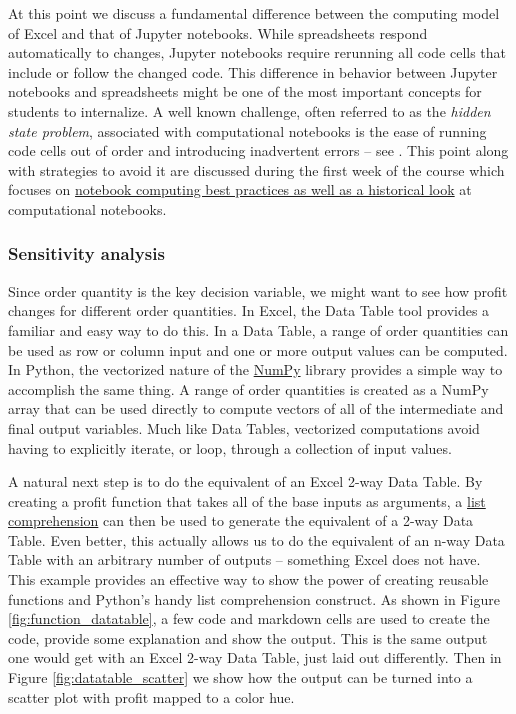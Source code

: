 \documentclass[ited]{informs3}                      %
\begin{document}
At this point we discuss a fundamental difference between the computing model of Excel and that of Jupyter notebooks. While spreadsheets respond automatically to changes, Jupyter notebooks require rerunning all code cells that include or follow the changed code. This difference in behavior between Jupyter notebooks and spreadsheets might be one of the most important concepts for students to internalize. A well known challenge, often referred to as the \textit{hidden state problem}, associated with computational notebooks is the ease of running code cells out of order and introducing inadvertent errors -- see \citet{johnson2020benefits,grusDonNotebooks2018}. This point along with strategies to avoid it are discussed during the first week of the course which focuses on \href{http://www.sba.oakland.edu/faculty/isken/courses/aap/jupyter_notebooks.html}{notebook computing best practices as well as a historical look} at computational notebooks.

\subsubsection{Sensitivity analysis}

Since order quantity is the key decision variable, we might want to see how profit changes for different order quantities. In Excel, the Data Table tool provides a familiar and easy way to do this. In a Data Table, a range of order quantities can be used as row or column input and one or more output values can be computed. In Python, the vectorized nature of the \href{https://numpy.org/}{NumPy} library \citep{harris2020array} provides a simple way to accomplish the same thing. A range of order quantities is created as a NumPy array that can be used directly to compute vectors of all of the intermediate and final output variables. Much like Data Tables, vectorized computations avoid having to explicitly iterate, or loop, through a collection of input values.

A natural next step is to do the equivalent of an Excel 2-way Data Table. By creating a profit function that takes all of the base inputs as arguments, a \href{https://realpython.com/list-comprehension-python/}{list comprehension} can then be used to generate the equivalent of a 2-way Data Table. Even better, this actually allows us to do the equivalent of an n-way Data Table with an arbitrary number of outputs -- something Excel does not have. This example provides an effective way to show the power of creating reusable functions and Python's handy list comprehension construct. As shown in Figure \ref{fig:function_datatable}, a few code and markdown cells are used to create the code, provide some explanation and show the output. This is the same output one would get with an Excel 2-way Data Table, just laid out differently. Then in Figure \ref{fig:datatable_scatter} we show how the output can be turned into a scatter plot with profit mapped to a color hue.
\end{document}
